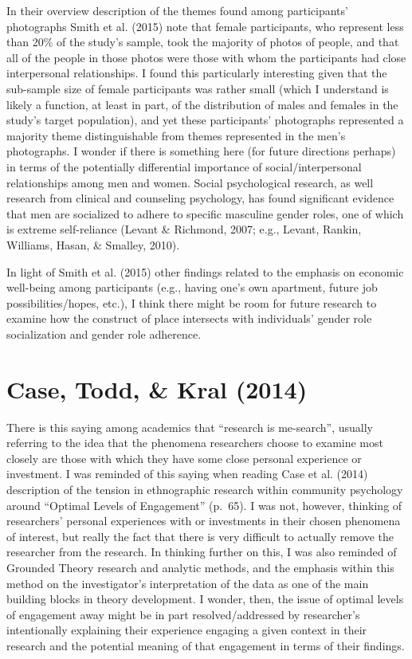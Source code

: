 \documentclass[11pt,]{tufte-handout}
\begin{document}
In their overview description of the themes found among participants'
photographs Smith et al. (2015) note that female participants, who
represent less than 20\% of the study's sample, took the majority of
photos of people, and that all of the people in those photos were those
with whom the participants had close interpersonal relationships. I
found this particularly interesting given that the sub-sample size of
female participants was rather small (which I understand is likely a
function, at least in part, of the distribution of males and females in
the study's target population), and yet these participants' photographs
represented a majority theme distinguishable from themes represented in
the men's photographs. I wonder if there is something here (for future
directions perhaps) in terms of the potentially differential importance
of social/interpersonal relationships among men and women. Social
psychological research, as well research from clinical and counseling
psychology, has found significant evidence that men are socialized to
adhere to specific masculine gender roles, one of which is extreme
self-reliance (Levant \& Richmond, 2007; e.g., Levant, Rankin, Williams,
Hasan, \& Smalley, 2010).

In light of Smith et al. (2015) other findings related to the emphasis
on economic well-being among participants (e.g., having one's own
apartment, future job possibilities/hopes, etc.), I think there might be
room for future research to examine how the construct of place
intersects with individuals' gender role socialization and gender role
adherence.

\section{Case, Todd, \& Kral (2014)}\label{case2014ethnography}

There is this saying among academics that ``research is me-search'',
usually referring to the idea that the phenomena researchers choose to
examine most closely are those with which they have some close personal
experience or investment. I was reminded of this saying when reading
Case et al. (2014) description of the tension in ethnographic research
within community psychology around ``Optimal Levels of Engagement''
(p.~65). I was not, however, thinking of researchers' personal
experiences with or investments in their chosen phenomena of interest,
but really the fact that there is very difficult to actually remove the
researcher from the research. In thinking further on this, I was also
reminded of Grounded Theory research and analytic methods, and the
emphasis within this method on the investigator's interpretation of the
data as one of the main building blocks in theory development. I wonder,
then, the issue of optimal levels of engagement away might be in part
resolved/addressed by researcher's intentionally explaining their
experience engaging a given context in their research and the potential
meaning of that engagement in terms of their findings.
\end{document}
